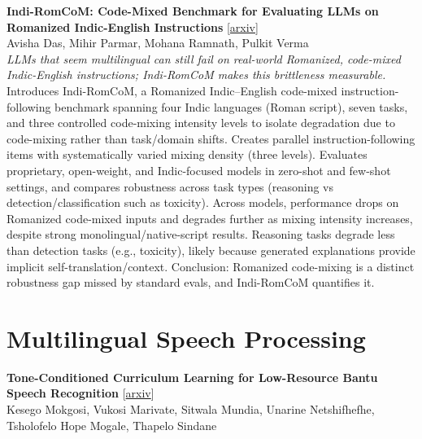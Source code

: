 \documentclass[12pt,letterpaper]{article}
\begin{document}
\medskip

{\small\textbf{Indi-RomCoM: Code-Mixed Benchmark for Evaluating LLMs on Romanized Indic-English Instructions}} {\scriptsize[\href{https://arxiv.org/abs/2606.30790}{arxiv}]}\\
{\scriptsize Avisha Das, Mihir Parmar, Mohana Ramnath, Pulkit Verma}\\

{\small\textit{LLMs that seem multilingual can still fail on real-world Romanized, code-mixed Indic-English instructions; Indi-RomCoM makes this brittleness measurable.}}\\[1pt]
{\footnotesize Introduces Indi-RomCoM, a Romanized Indic--English code-mixed instruction-following benchmark spanning four Indic languages (Roman script), seven tasks, and three controlled code-mixing intensity levels to isolate degradation due to code-mixing rather than task/domain shifts. Creates parallel instruction-following items with systematically varied mixing density (three levels). Evaluates proprietary, open-weight, and Indic-focused models in zero-shot and few-shot settings, and compares robustness across task types (reasoning vs detection/classification such as toxicity). Across models, performance drops on Romanized code-mixed inputs and degrades further as mixing intensity increases, despite strong monolingual/native-script results. Reasoning tasks degrade less than detection tasks (e.g., toxicity), likely because generated explanations provide implicit self-translation/context. Conclusion: Romanized code-mixing is a distinct robustness gap missed by standard evals, and Indi-RomCoM quantifies it.}

\medskip


\section*{Multilingual Speech Processing}

{\small\textbf{Tone-Conditioned Curriculum Learning for Low-Resource Bantu Speech Recognition}} {\scriptsize[\href{https://arxiv.org/abs/2606.31642}{arxiv}]}\\
{\scriptsize Kesego Mokgosi, Vukosi Marivate, Sitwala Mundia, Unarine Netshifhefhe, Tsholofelo Hope Mogale, Thapelo Sindane}\\
\end{document}
